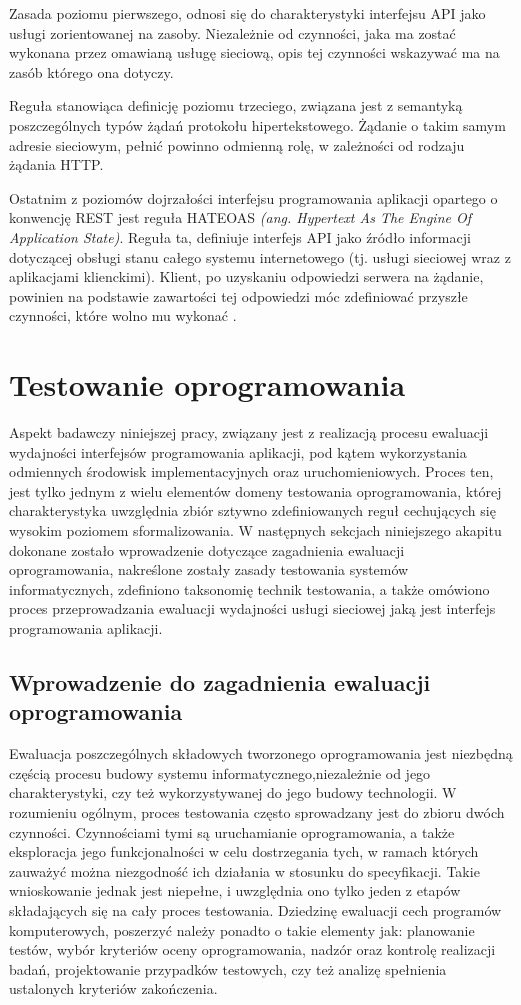 Zasada poziomu pierwszego, odnosi się do charakterystyki interfejsu API jako usługi zorientowanej na zasoby. Niezależnie od czynności, jaka ma zostać wykonana przez omawianą usługę sieciową, opis tej czynności wskazywać ma na zasób którego ona dotyczy.

Reguła stanowiąca definicję poziomu trzeciego, związana jest z semantyką poszczególnych typów żądań protokołu hipertekstowego. Żądanie o takim samym adresie sieciowym, pełnić powinno odmienną rolę, w zależności od rodzaju żądania HTTP.

Ostatnim z poziomów dojrzałości interfejsu programowania aplikacji opartego o konwencję REST jest reguła HATEOAS \textit{(ang. Hypertext As The Engine Of Application State)}. Reguła ta, definiuje interfejs API jako źródło informacji dotyczącej obsługi stanu całego systemu internetowego (tj. usługi sieciowej wraz z aplikacjami klienckimi). Klient, po uzyskaniu odpowiedzi serwera na żądanie, powinien na podstawie zawartości tej odpowiedzi móc zdefiniować przyszłe czynności, które wolno mu wykonać \cite{webber2010rest}.  

\section{Testowanie oprogramowania}
Aspekt badawczy niniejszej pracy, związany jest z realizacją procesu ewaluacji wydajności interfejsów programowania aplikacji, pod kątem wykorzystania odmiennych środowisk implementacyjnych oraz uruchomieniowych. Proces ten, jest tylko jednym z wielu elementów domeny testowania oprogramowania, której charakterystyka uwzględnia zbiór sztywno zdefiniowanych reguł cechujących się wysokim poziomem sformalizowania. W następnych sekcjach niniejszego akapitu dokonane zostało wprowadzenie dotyczące zagadnienia ewaluacji oprogramowania, nakreślone zostały zasady testowania systemów informatycznych, zdefiniono taksonomię technik testowania, a także omówiono proces przeprowadzania ewaluacji wydajności usługi sieciowej jaką jest interfejs programowania aplikacji. 
\subsection*{Wprowadzenie do zagadnienia ewaluacji oprogramowania}
Ewaluacja poszczególnych składowych tworzonego oprogramowania jest niezbędną częścią procesu budowy systemu informatycznego,niezależnie od jego charakterystyki, czy też wykorzystywanej do jego budowy technologii. W rozumieniu ogólnym, proces testowania często sprowadzany jest do zbioru dwóch czynności. Czynnościami tymi są uruchamianie oprogramowania, a także eksploracja jego funkcjonalności w celu dostrzegania tych, w ramach których zauważyć można niezgodność ich działania w stosunku do specyfikacji. Takie wnioskowanie jednak jest niepełne, i uwzględnia ono tylko jeden z etapów składających się na cały proces testowania. Dziedzinę ewaluacji cech programów komputerowych, poszerzyć należy ponadto o takie elementy jak: planowanie testów, wybór kryteriów oceny oprogramowania, nadzór oraz kontrolę realizacji badań, projektowanie przypadków testowych, czy też analizę spełnienia ustalonych kryteriów zakończenia.

